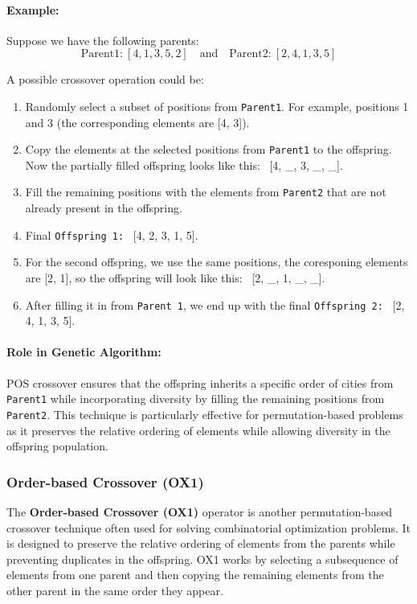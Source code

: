 \documentclass[12pt]{article}
\begin{document}
\paragraph{Example:}

Suppose we have the following parents:
\[
\text{Parent1:} \ [4, 1, 3, 5, 2]
\quad \text{and} \quad \text{Parent2:} \ [2, 4, 1, 3, 5]
\]

A possible crossover operation could be:

\begin{enumerate}
    \item Randomly select a subset of positions from \texttt{Parent1}. For example, positions 1 and 3 (the corresponding elements are [4, 3]).
    \item Copy the elements at the selected positions from \texttt{Parent1} to the offspring. Now the partially filled offspring looks like this: \ [4, \_, 3, \_, \_].
    \item Fill the remaining positions with the elements from \texttt{Parent2} that are not already present in the offspring.
    \item Final \texttt{Offspring 1:} \ [4, 2, 3, 1, 5].
    \item For the second offspring, we use the same positions, the coresponing elements are [2, 1], so the offspring will look like this: \ [2, \_, 1, \_, \_].
    \item After filling it in from \texttt{Parent 1}, we end up with the final \texttt{Offspring 2:} \ [2, 4, 1, 3, 5].
\end{enumerate}



\paragraph{Role in Genetic Algorithm:}

POS crossover ensures that the offspring inherits a specific order of cities from \texttt{Parent1} while incorporating diversity by filling the remaining positions from \texttt{Parent2}. This technique is particularly effective for permutation-based problems as it preserves the relative ordering of elements while allowing diversity in the offspring population.

\subsubsection{Order-based Crossover (OX1)}

The \textbf{Order-based Crossover (OX1)} operator is another permutation-based crossover technique often used for solving combinatorial optimization problems. It is designed to preserve the relative ordering of elements from the parents while preventing duplicates in the offspring. OX1 works by selecting a subsequence of elements from one parent and then copying the remaining elements from the other parent in the same order they appear.
\end{document}
